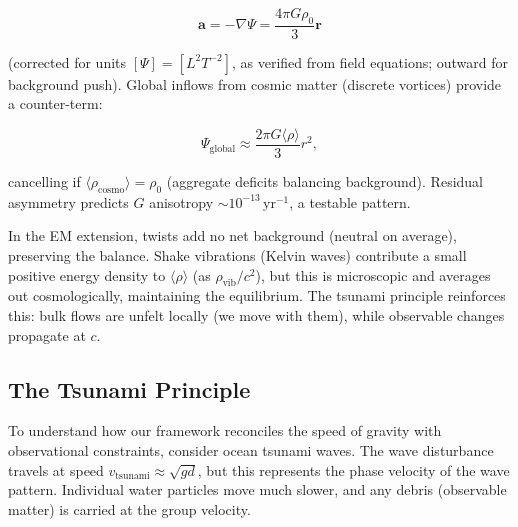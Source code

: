 \begin{equation}
\mathbf{a} = -\nabla \Psi = \frac{4\pi G \rho_0}{3} \mathbf{r}
\end{equation}

(corrected for units $[\Psi] = [L^2 T^{-2}]$, as verified from field equations; outward for background push). Global inflows from cosmic matter (discrete vortices) provide a counter-term:

\begin{equation}
\Psi_{\text{global}} \approx \frac{2\pi G \langle \rho \rangle}{3} r^2,
\end{equation}

cancelling if $\langle \rho_\text{cosmo} \rangle = \rho_0$ (aggregate deficits balancing background). Residual asymmetry predicts $G$ anisotropy $\sim 10^{-13} \,\mathrm{yr}^{-1}$, a testable pattern.

In the EM extension, twists add no net background (neutral on average), preserving the balance. Shake vibrations (Kelvin waves) contribute a small positive energy density to $\langle \rho \rangle$ (as $\rho_{\text{vib}} / c^2$), but this is microscopic and averages out cosmologically, maintaining the equilibrium. The tsunami principle reinforces this: bulk flows are unfelt locally (we move with them), while observable changes propagate at $c$.

\medskip

\subsection{The Tsunami Principle}

To understand how our framework reconciles the speed of gravity with observational constraints, consider ocean tsunami waves. The wave disturbance travels at speed $v_{\text{tsunami}} \approx \sqrt{g d}$, but this represents the phase velocity of the wave pattern. Individual water particles move much slower, and any debris (observable matter) is carried at the group velocity.

